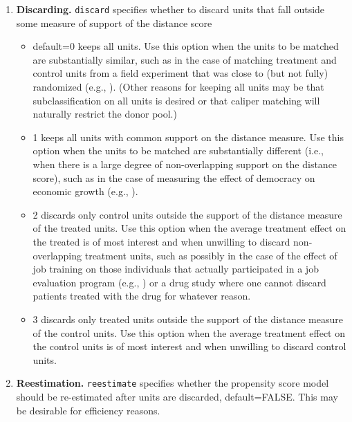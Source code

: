 \documentclass[oneside,letterpaper,titlepage]{article}
\begin{document}
\begin{enumerate}
\item \textbf{Discarding.} \texttt{discard} specifies whether to
  discard units that fall outside some measure of support of the
  distance score
  \begin{itemize}
  \item default=0 keeps all units.  Use this option when the units to
    be matched are substantially similar, such as in the case of
    matching treatment and control units from a field experiment that
    was close to (but not fully) randomized (e.g., \citealt{Imai03}).
    (Other reasons for keeping all units may be that subclassification
    on all units is desired or that caliper matching will naturally
    restrict the donor pool.)
  \item 1 keeps all units with common support on the distance measure.
    Use this option when the units to be matched are substantially
    different (i.e., when there is a large degree of non-overlapping
    support on the distance score), such as in the case of measuring
    the effect of democracy on economic growth (e.g.,
    \citealt{KinZen03}).
  \item 2 discards only control units outside the support of the
    distance measure of the treated units.  Use this option when the
    average treatment effect on the treated is of most interest and
    when unwilling to discard non-overlapping treatment units, such as
    possibly in the case of the effect of job training on those
    individuals that actually participated in a job evaluation program
    (e.g., \citealt{HecIchTod98}) or a drug study where one cannot
    discard patients treated with the drug for whatever reason.
  \item 3 discards only treated units outside the support of the
    distance measure of the control units.  Use this option when the
    average treatment effect on the control units is of most interest
    and when unwilling to discard control units.
  \end{itemize}

\item \textbf{Reestimation.} \texttt{reestimate} specifies whether the
  propensity score model should be re-estimated after units are
  discarded, default=FALSE.  This may be desirable for efficiency
  reasons. 


\end{enumerate}
\end{document}

